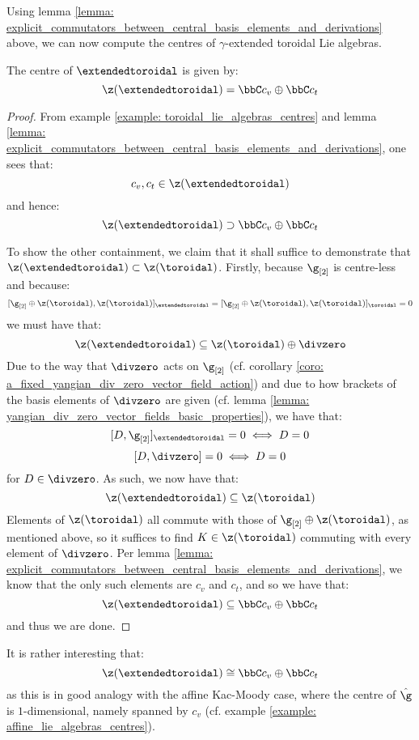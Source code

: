         Using lemma \ref{lemma: explicit_commutators_between_central_basis_elements_and_derivations} above, we can now compute the centres of $\gamma$-extended toroidal Lie algebras.
        \begin{proposition} \label{prop: centres_of_yangian_extended_toroidal_lie_algebras}
            The centre of $\extendedtoroidal$ is given by:
                $$\z(\extendedtoroidal) = \bbC c_v \oplus \bbC c_t$$
        \end{proposition}
            \begin{proof}
                From example \ref{example: toroidal_lie_algebras_centres} and lemma \ref{lemma: explicit_commutators_between_central_basis_elements_and_derivations}, one sees that:
                    $$c_v, c_t \in \z(\extendedtoroidal)$$
                and hence:
                    $$\z(\extendedtoroidal) \supset \bbC c_v \oplus \bbC c_t$$
                    
                To show the other containment, we claim that it shall suffice to demonstrate that $\z(\extendedtoroidal) \subset \z(\toroidal)$. Firstly, because $\g_{[2]}$ is centre-less and because:
                    $$[\g_{[2]} \oplus \z(\toroidal), \z(\toroidal)]_{\extendedtoroidal} = [\g_{[2]} \oplus \z(\toroidal), \z(\toroidal)]_{\toroidal} = 0$$
                we must have that:
                    $$\z(\extendedtoroidal) \subseteq \z(\toroidal) \oplus \divzero$$
                Due to the way that $\divzero$ acts on $\g_{[2]}$ (cf. corollary \ref{coro: a_fixed_yangian_div_zero_vector_field_action}) and due to how brackets of the basis elements of $\divzero$ are given (cf. lemma \ref{lemma: yangian_div_zero_vector_fields_basic_properties}), we have that:
                    $$[D, \g_{[2]}]_{\extendedtoroidal} = 0 \iff D = 0$$
                    $$[D, \divzero] = 0 \iff D = 0$$
                for $D \in \divzero$. As such, we now have that:
                    $$\z(\extendedtoroidal) \subseteq \z(\toroidal)$$
                Elements of $\z(\toroidal)$ all commute with those of $\g_{[2]} \oplus \z(\toroidal)$, as mentioned above, so it suffices to find $K \in \z(\toroidal)$ commuting with every element of $\divzero$. Per lemma \ref{lemma: explicit_commutators_between_central_basis_elements_and_derivations}, we know that the only such elements are $c_v$ and $c_t$, and so we have that:
                    $$\z(\extendedtoroidal) \subseteq \bbC c_v \oplus \bbC c_t$$
                and thus we are done.
            \end{proof}
        \begin{remark}
            It is rather interesting that:
                $$\z(\extendedtoroidal) \cong \bbC c_v \oplus \bbC c_t$$
            as this is in good analogy with the affine Kac-Moody case, where the centre of $\hat{\g}$ is $1$-dimensional, namely spanned by $c_v$ (cf. example \ref{example: affine_lie_algebras_centres}).
        \end{remark}

